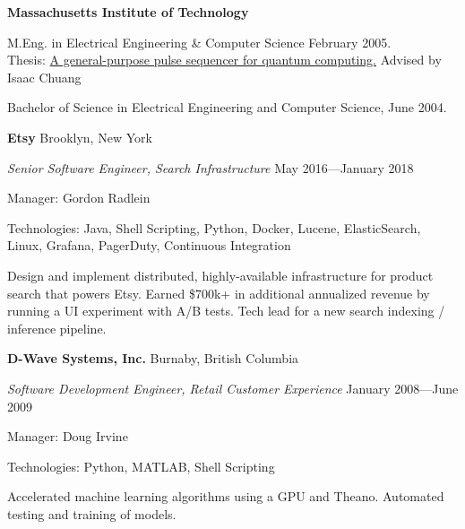 \documentclass[letter]{article}
\begin{document}
{\bf Massachusetts Institute of Technology}
\par
M.Eng. in Electrical Engineering \& Computer Science \hspace*{\fill}February 2005.\\
Thesis: \href{https://citeseerx.ist.psu.edu/viewdoc/summary?doi=10.1.1.120.6651&rank=1}{A general-purpose pulse sequencer for quantum computing.}{} Advised by Isaac Chuang\\
\par
Bachelor of Science in Electrical Engineering and Computer Science, June 2004.
\vspace{\baselineskip}
\par
\vspace{\baselineskip}
\par
{\bf {Etsy}} \hfill Brooklyn, New York
\par
{\em Senior Software Engineer, Search Infrastructure} \hfill May 2016---January 2018
\par
Manager: Gordon Radlein
\vspace{0.5\baselineskip}
\par
Technologies: Java, Shell Scripting, Python, Docker, Lucene, ElasticSearch, Linux, Grafana, PagerDuty, Continuous Integration
\vspace{0.5\baselineskip}
\par
Design and implement distributed, highly-available infrastructure for product search that powers Etsy. Earned \$700k+ in additional annualized revenue by running a UI experiment with A/B tests. Tech lead for a new search indexing / inference pipeline.

\vspace{\baselineskip}
\par
{\bf {D-Wave Systems, Inc.}} \hfill Burnaby, British Columbia
\par
{\em Software Development Engineer, Retail Customer Experience} \hfill January 2008---June 2009
\par
Manager: Doug Irvine
\vspace{0.5\baselineskip}
\par
Technologies: Python, MATLAB, Shell Scripting
\vspace{0.5\baselineskip}
\par
Accelerated machine learning algorithms using a GPU and Theano. Automated testing and training of models.
\end{document}

